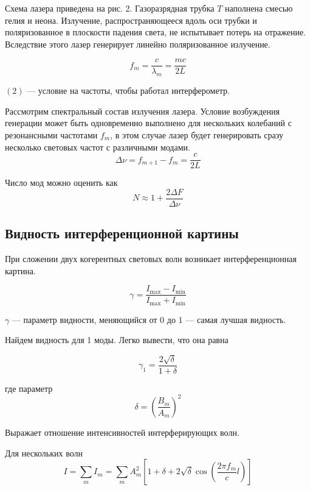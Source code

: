 \documentclass[a4paper, 12pt]{article}%
\begin{document}
Схема лазера приведена на рис. 2. Газоразрядная трубка $T$ наполнена смесью гелия и неона. Излучение, распространяющееся вдоль оси трубки и поляризованное в плоскости падения света, не испытывает потерь на отражение. Вследствие этого лазер генерирует линейно поляризованное излучение.

\begin{equation}
f_m = \frac{c}{\lambda_m} = \frac{mc}{2L}
\end{equation}

$(2)$ --- условие на частоты, чтобы работал интерферометр.

Рассмотрим спектральный состав излучения лазера. Условие возбуждения генерации может быть одновременно выполнено для нескольких колебаний с резонансными частотами $f_m$, в этом случае лазер будет генерировать сразу несколько световых частот с различными модами.
\begin{equation}
\Delta \nu = f_{m+1} - f_m = \frac{c}{2L}
\end{equation}

Число мод можно оценить как
\begin{equation}
N \approx 1 + \frac{2\Delta F}{\Delta \nu}
\end{equation}

\subsection*{Видность интерференционной картины}
При сложении двух когерентных световых волн возникает интерференционная картина.

\begin{equation}
\gamma = \frac{I_{\max} - I_{\min}}{I_{\max} + I_{\min}}
\end{equation}

$\gamma$ --- параметр видности, меняющийся от 0 до 1 --- самая лучшая видность.

Найдем видность для 1 моды. Легко вывести, что она равна

\begin{equation}
\gamma_1 = \frac{2 \sqrt{\delta}}{1 + \delta}
\end{equation}

где параметр
\begin{equation}
\delta = \left( \frac{B_m}{A_m}\right)^2
\end{equation}

Выражает отношение интенсивностей интерферирующих волн.

Для нескольких волн
\begin{equation}
I = \sum\limits_m I_m = \sum\limits_m A_m^2 \left[1 + \delta + 2\sqrt{\delta}\cos\left(\frac{2\pi f_m}{c}l\right)\right]
\end{equation}
\end{document}
